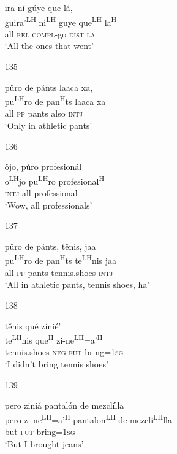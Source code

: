 \begin{itemize}
\glll   ira n\'{i} g\'{u}ye que l\'{a},\\
  guira'\textsuperscript{LH} ni\textsuperscript{LH} guye que\textsuperscript{LH} la\textsuperscript{H} \\
all \textsc{rel} \textsc{compl}-go \textsc{dist} \textsc{la}\\
\glt `All the ones that went'



\item[135]
 
\glll   p\v{u}ro de p\'{a}nts laaca xa, \\ 
 pu\textsuperscript{LH}ro de pan\textsuperscript{H}ts laaca xa\\
all \textsc{pp} pants also \textsc{intj}\\
\glt `Only in athletic pants'




\item[136]
 
\glll   \v{o}jo, p\v{u}ro profesion\'{a}l\\
 o\textsuperscript{LH}jo pu\textsuperscript{LH}ro profesional\textsuperscript{H} \\
\textsc{intj} all professional\\
\glt `Wow, all professionals'




\item[137]
 
\glll   p\v{u}ro de p\'{a}nts, t\v{e}nis, jaa\\
 pu\textsuperscript{LH}ro de pan\textsuperscript{H}ts te\textsuperscript{LH}nis jaa\\
  all \textsc{pp} pants tennis.shoes \textsc{intj}\\
\glt `All in athletic pants, tennis shoes, ha'
 


\item[138]
 
\glll   t\v{e}nis qu\'{e} z\'{i}ni\'{e}' \\
 te\textsuperscript{LH}nis  que\textsuperscript{H} zi-ne\textsuperscript{LH}=a'\textsuperscript{H} \\
tennis.shoes \textsc{neg} \textsc{fut}-bring=\textsc{1sg}\\
\glt `I didn't bring tennis shoes'
 


\item[139]
 
\glll  pero zini\'{a} pantal\'{o}n de mezcl\'{i}lla\\
pero zi-ne\textsuperscript{LH}=a'\textsuperscript{H} pantalon\textsuperscript{LH} de mezcli\textsuperscript{LH}lla\\
but \textsc{fut}-bring=\textsc{1sg}\\
\glt `But I brought jeans'
 



\end{itemize}
